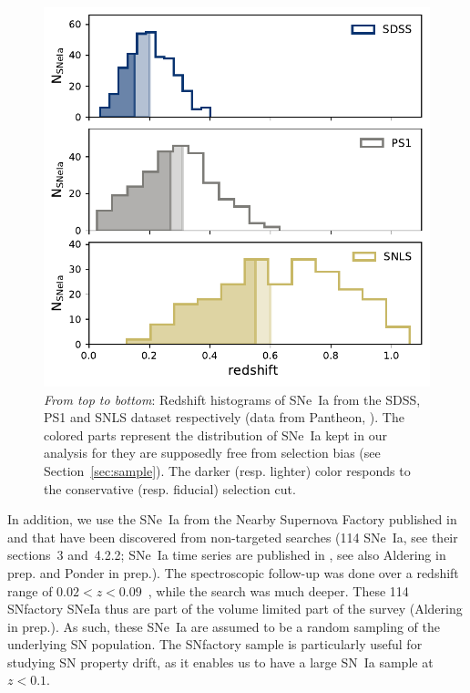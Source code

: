 \documentclass[]{aa} %
\newcommand{\mr}[1]{{\textcolor[rgb]{0.60,0.10,0.6}{#1}}}
\begin{document}
\begin{figure}
    \centering
    \includegraphics[width=0.95\linewidth]{Article_figures/hist_surveys_cuts_55-cividis.pdf}
    \caption{\textit{From top to bottom}: Redshift histograms of SNe~Ia from
        the SDSS, PS1 and SNLS dataset respectively (data from Pantheon,
        \citealt{scolnic2018a}). The colored parts represent the distribution
        of SNe~Ia kept in our analysis for they are supposedly free from
        selection bias (see Section~\ref{sec:sample}). The darker (resp. lighter)
        color responds to the conservative (resp. fiducial) selection cut.}
    \label{fig:cuts}
\end{figure}

In addition, we use the SNe~Ia from the Nearby Supernova Factory
\citep[SNfactory,][]{aldering2002} published in \cite{rigault2018} and that have
been discovered from non-targeted searches (114 SNe~Ia, see their sections~3
and~4.2.2; SNe~Ia time series are published in \citealt{saunders2020}, see also Aldering in prep. and Ponder in prep.). The spectroscopic
follow-up was done over a redshift range of $0.02 < z < 0.09$~\citep[as
in][]{rigault2018}, while the search was much deeper. \mr{These 114 SNfactory SNeIa 
thus are part of the volume limited part of the survey (Aldering in prep.).}
As such, these SNe~Ia are
assumed to be a random sampling of the underlying SN population. The SNfactory
sample is particularly useful for studying SN property drift, as it enables us
to have a large SN~Ia sample at $z<0.1$.  
\end{document}
